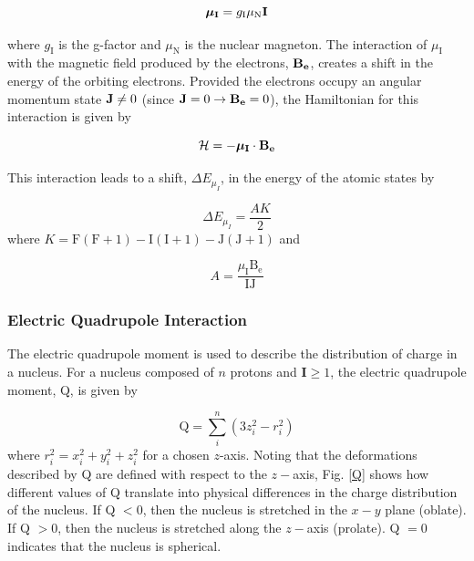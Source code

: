 \begin{equation}
\boldsymbol{\mu}_{\mathrm{\bf{I}}} = g_{\mathrm{I}}\mu_{\mathrm{N}}\mathrm{\bf{I}}
\end{equation}

\noindent where $g_{\mathrm{I}}$ is the g-factor and $\mu_{\mathrm{N}}$ is the nuclear magneton\cite{Nut}. The interaction of $\mu_{\mathrm{I}}$ with the magnetic field produced by the electrons, $\mathrm{\bf{B_e}}$, creates a shift in the energy of the orbiting electrons. Provided the electrons occupy an angular momentum state $\mathrm{\bf{J}} \neq 0$ (since $\mathrm{\bf{J}} = 0 \rightarrow \mathrm{\bf{B_e}} = 0$), the Hamiltonian for this interaction is given by \cite{TomT}

\begin{equation}
\mathcal{H} = -\boldsymbol{\mu}_{\mathrm{\bf{I}}} \cdot \mathrm{\bf{B_e}}
\end{equation}

\noindent This interaction leads to a shift, $\Delta E_{\mu_I}$, in the energy of the atomic states by

\begin{equation}
\Delta E_{\mu_I} = \frac{AK}{2}
\end{equation}
where $K = \mathrm{F(F+1) - I(I+1) - J(J+1)}$ and 

\begin{equation}
A = \frac{\mu_{\mathrm{I}}\mathrm{B_e}}{\mathrm{IJ}}
\end{equation}

\noindent \subsubsection{Electric Quadrupole Interaction}
The electric quadrupole moment is used to describe the distribution of charge in a nucleus. For a nucleus composed of $n$ protons and $\mathbf{I}\geq1$, the electric quadrupole moment, Q, is given by

\begin{equation}
\mathrm{Q} = \sum_i^n (3z_i^2-r_i^2)
\end{equation}
where $r_i^2 = x_i^2+y_i^2+z_i^2$ for a chosen $z$-axis\cite{Nut}. Noting that the deformations described by Q are defined with respect to the $z-$axis, Fig. \ref{Q} shows how different values of Q translate into physical differences in the charge distribution of the nucleus. If Q $ < 0$, then the nucleus is stretched in the $x-y$ plane (oblate). If Q $ > 0$, then the nucleus is stretched along the $z-$axis (prolate). Q $=0$ indicates that the nucleus is spherical. 

